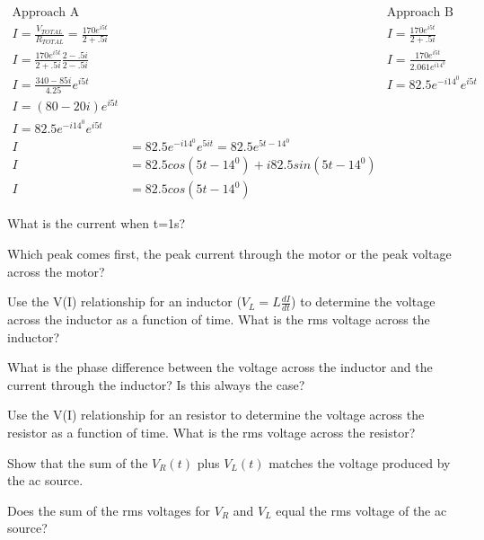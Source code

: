 \begin{align*}
\text{Approach A}&&\text{Approach B}\\
I = \frac{V_{TOTAL}}{R_{TOTAL}}=\frac{170e^{i5t}}{2+.5i}&&I = \frac{170e^{i5t}}{2+.5i}\\
I=\frac{170e^{i5t}}{2+.5i}\frac{2-.5i}{2-.5i}&&I = \frac{170e^{i5t}}{2.061e^{i14^0}}\\
I=\frac{340-85i}{4.25}e^{i5t}&&I = 82.5e^{-i14^0}e^{i5t}\\
I=(80-20i)e^{i5t}&&\\
I=82.5e^{-i14^0}e^{i5t}&&\\
I&=82.5e^{-i14^0}e^{5it}=82.5e^{5t-14^0}\\
I&=82.5cos(5t-14^0)+i82.5sin(5t-14^0)\\
I&=82.5cos(5t-14^0)
\end{align*}

\begin{alevel}
What is the current when t=1s?
\end{alevel}

\begin{alevel}
Which peak comes first, the peak current through the motor or the peak voltage across the motor?
\end{alevel}

\begin{blevel}
Use the V(I) relationship for an inductor ($V_L=L\frac{dI}{dt}$) to determine the voltage across the inductor as a function of time. What is the rms voltage across the inductor?
\end{blevel}

\begin{blevel}
What is the phase difference between the voltage across the inductor and the current through the inductor? Is this always the case?
\end{blevel}

\begin{blevel}
Use the V(I) relationship for an resistor to determine the voltage across the resistor as a function of time. What is the rms voltage across the resistor?
\end{blevel}

\begin{clevel}
Show that the sum of the $V_R(t)$ plus $V_L(t)$ matches the voltage produced by the ac source.
\end{clevel}

\begin{alevel}
Does the sum of the rms voltages for $V_R$ and $V_L$ equal the rms voltage of the ac source?
\end{alevel}


